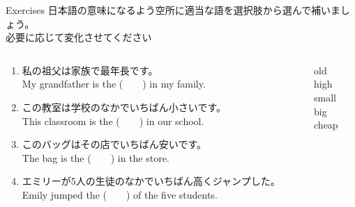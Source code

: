 \documentclass[aspectratio=169,xcolor={dvipsnames,table}]{beamer}
\begin{document}
\begin{frame}[plain]{Exercises}
日本語の意味になるよう空所に適当な語を選択肢から選んで補いましょう。\\必要に応じて変化させてください%
\hfill{\scriptsize {}}

\begin{columns}[t]
 \begin{column}{.78\textwidth}
   \begin{enumerate}
  \item 私の祖父は家族で最年長です。\\
	My grandfather is the (~~~~) in my family. 
    \item この教室は学校のなかでいちばん小さいです。\\
	This classroom is the (~~~~) in our school. 
    \item このバッグはその店でいちばん安いです。\\
	The bag is the (~~~~) in the store.
    \item エミリーが5人の生徒のなかでいちばん高くジャンプした。\\
	Emily jumped the (~~~~) of the five students.

\end{enumerate}

 \end{column}
\begin{column}{.2\textwidth}
 \begin{tcolorbox}
  old\\
  high\\
  small\\
  big\\
  cheap
 \end{tcolorbox}
\end{column}
\end{columns}
\end{frame}
\end{document}
